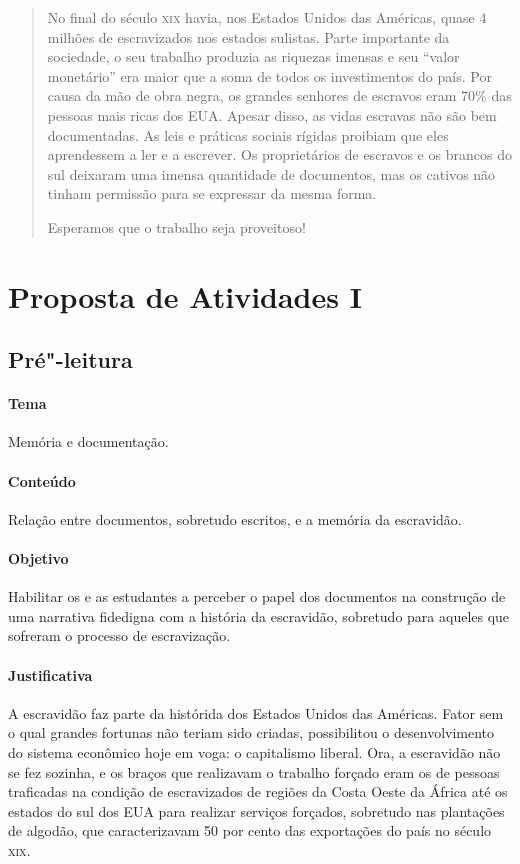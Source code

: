 \documentclass[11pt]{extarticle}
\begin{document}
\begin{abstract}
No final do século \textsc{xix} havia, nos Estados Unidos das Américas, 
quase 4 milhões de escravizados nos estados sulistas. Parte importante 
da sociedade, o seu trabalho produzia as riquezas imensas e seu ``valor 
monetário'' era maior que a soma de todos os investimentos do país. 
Por causa da mão de obra negra, os grandes senhores de escravos eram 70\% 
das pessoas mais ricas dos {EUA}. Apesar disso, as vidas escravas 
não são bem documentadas. As leis e práticas sociais rígidas proibiam 
que eles aprendessem a ler e a escrever. Os proprietários de escravos 
e os brancos do sul deixaram uma imensa quantidade de documentos, mas 
os cativos não tinham permissão para se expressar da mesma forma.

Esperamos que o trabalho seja proveitoso!


\end{abstract}

\tableofcontents

\section{Proposta de Atividades I}




\subsection{Pré"-leitura}

\paragraph{Tema} Memória e documentação.

\paragraph{Conteúdo} Relação entre documentos, sobretudo escritos, e a memória da escravidão.

\paragraph{Objetivo} Habilitar os e as estudantes a perceber o papel dos documentos na 
construção de uma narrativa fidedigna com a história da escravidão, sobretudo para aqueles
que sofreram o processo de escravização.

\paragraph{Justificativa} A escravidão faz parte da histórida dos Estados Unidos das Américas.
Fator sem o qual grandes fortunas não teriam sido criadas, possibilitou o desenvolvimento
do sistema econômico hoje em voga: o capitalismo liberal. Ora, a escravidão não se fez sozinha, 
e os braços que realizavam o trabalho forçado eram os de pessoas traficadas na condição de escravizados
de regiões da Costa Oeste da África até os estados do sul dos EUA para realizar serviços forçados,
sobretudo nas plantações de algodão, que caracterizavam 50 por cento das exportações do país no século \textsc{xix}. 
\end{document}
